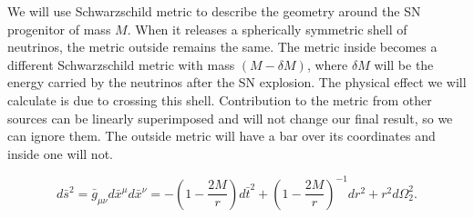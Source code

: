 \documentclass[aps,showpacs,onecolumn,floats,prd,superscriptaddress,nofootinbib]{revtex4-1}
\begin{document}
We will use Schwarzschild metric to describe the geometry around the SN progenitor of mass $M$.
When it releases a spherically symmetric shell of neutrinos, the metric outside remains the same.
The metric inside becomes a different Schwarzschild metric with mass $(M-\delta M)$, where $\delta M$ will be the energy carried by the neutrinos after the SN explosion. 
The physical effect we will calculate is due to crossing this shell.
Contribution to the metric from other sources can be linearly superimposed and will not change our final result, so we can ignore them.
The outside metric will have a bar over its coordinates and inside one will not. 
 
\begin{equation}
	d\bar{s}^2 = \bar{g}_{\mu \nu} d\bar{x}^\mu d\bar{x}^\nu = - \left( 1 - \frac{2M}{r} \right) d\bar{t}^2 + \left( 1 - \frac{2M}{r} \right)^{-1} d {r}^2 + r^2 d {\Omega}_2^2. \label{SCH}
\end{equation}
\end{document}
